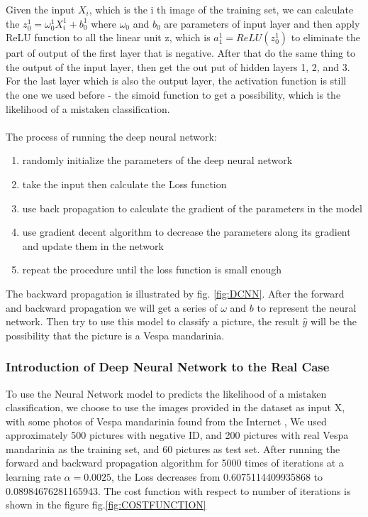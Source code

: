 \documentclass{mcmthesis}
\begin{document}
Given the input $X_i$, which is the i th image of the training set, we can calculate the $z_{0}^{1} = \omega_{0}^{1} X_{i}^{1} + b_{0}^{1}$ where $\omega_{0}$ and $b_{0}$ are parameters of input layer and then apply ReLU function to all the 
linear unit z, which is $a_{1}^{1} = ReLU(z_{0}^{1})$ to eliminate the part of output of the first layer that is negative. 
After that do the same thing to the output of the input layer, then get the out put of hidden layers 1, 2, and 3. For the last layer which is also the output layer, the activation function is still the one we used before - the simoid function to get a possibility, which is the likelihood of a mistaken classification.
\paragraph{ }
The process of running the deep neural network: 
\begin{enumerate}
    \item randomly initialize the parameters of the deep neural network
    \item take the input then calculate the Loss function
    \item use back propagation to calculate the gradient of the parameters in the model
    \item use gradient decent algorithm to decrease the parameters along its gradient and update them in the network
    \item repeat the procedure until the loss function is small enough
\end{enumerate}



The backward propagation is illustrated by fig. \ref{fig:DCNN}. After the forward and backward propagation we will get a series of $\omega$ and $b$ to represent the neural network. Then try to use this model to classify a picture, the result $\hat{y}$ will be the possibility that the picture is a Vespa mandarinia.
\subsubsection{Introduction of Deep Neural Network to the Real Case} 
To use the Neural Network model to  predicts the likelihood of a mistaken classification, we choose to use the images provided in the dataset as input X, with some photos of Vespa mandarinia found from the Internet \cite{AGH} \cite{Source2} \cite{Source3} \cite{Source4},
We used approximately 500 pictures with negative ID, and 200 pictures with real Vespa mandarinia as the training set, and 60 pictures as test set. After running the 
forward and backward propagation algorithm for 5000 times of iterations at a learning rate $\alpha = 0.0025$, the Loss decreases from  0.6075114409935868 to 0.08984676281165943. The cost function with respect to number of iterations is shown in the figure fig.\ref{fig:COSTFUNCTION}
\end{document}
